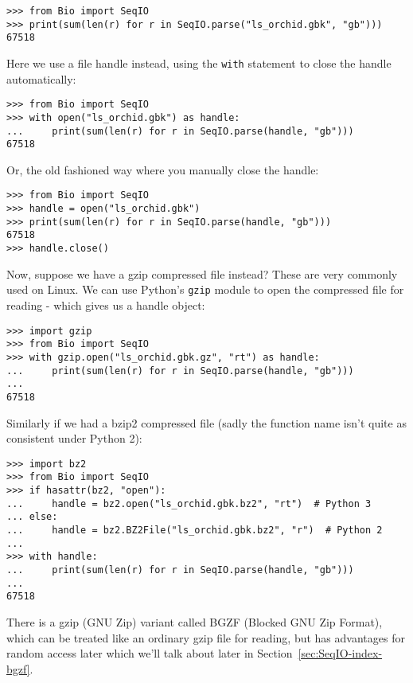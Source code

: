\begin{verbatim}
>>> from Bio import SeqIO
>>> print(sum(len(r) for r in SeqIO.parse("ls_orchid.gbk", "gb")))
67518
\end{verbatim}

\noindent
Here we use a file handle instead, using the \verb|with| statement
to close the handle automatically:

\begin{verbatim}
>>> from Bio import SeqIO
>>> with open("ls_orchid.gbk") as handle:
...     print(sum(len(r) for r in SeqIO.parse(handle, "gb")))
67518
\end{verbatim}

\noindent
Or, the old fashioned way where you manually close the handle:

\begin{verbatim}
>>> from Bio import SeqIO
>>> handle = open("ls_orchid.gbk")
>>> print(sum(len(r) for r in SeqIO.parse(handle, "gb")))
67518
>>> handle.close()
\end{verbatim}

Now, suppose we have a gzip compressed file instead? These are very
commonly used on Linux. We can use Python's \verb|gzip| module to open
the compressed file for reading - which gives us a handle object:

\begin{verbatim}
>>> import gzip
>>> from Bio import SeqIO
>>> with gzip.open("ls_orchid.gbk.gz", "rt") as handle:
...     print(sum(len(r) for r in SeqIO.parse(handle, "gb")))
...
67518
\end{verbatim}

Similarly if we had a bzip2 compressed file (sadly the function name isn't
quite as consistent under Python 2):

\begin{verbatim}
>>> import bz2
>>> from Bio import SeqIO
>>> if hasattr(bz2, "open"):
...     handle = bz2.open("ls_orchid.gbk.bz2", "rt")  # Python 3
... else:
...     handle = bz2.BZ2File("ls_orchid.gbk.bz2", "r")  # Python 2
...
>>> with handle:
...     print(sum(len(r) for r in SeqIO.parse(handle, "gb")))
...
67518
\end{verbatim}

There is a gzip (GNU Zip) variant called BGZF (Blocked GNU Zip Format),
which can be treated like an ordinary gzip file for reading, but has
advantages for random access later which we'll talk about later in
Section~\ref{sec:SeqIO-index-bgzf}.

